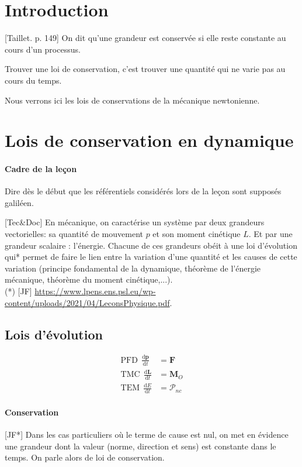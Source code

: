 \documentclass[11pt]{report}
\numberwithin{figure}{section}
\numberwithin{equation}{section}
\numberwithin{table}{section}
\newcommand{\ud}{\mathrm{d}}
\newcommand{\1}{\boldsymbol{1}}
\begin{document}
\section*{Introduction}


[Taillet. p. 149] On dit qu'une grandeur est conservée si elle reste constante au cours d'un processus.

Trouver une loi de conservation, c’est trouver une quantité qui ne varie pas au cours du temps.

Nous verrons ici les lois de conservations de la mécanique newtonienne.

\section{Lois de conservation en dynamique}

\paragraph{Cadre de la leçon} Dire dès le début que les référentiels considérés lors de la leçon sont supposés galiléen.

[Tec\&Doc] En mécanique, on caractérise un système par deux grandeurs vectorielles: sa quantité de mouvement $p$ et son moment cinétique $L$. Et par une grandeur scalaire : l'énergie. Chacune de ces grandeurs obéit à une loi d'évolution qui* permet de faire le lien entre la variation d’une quantité et les causes de cette variation (principe fondamental de la dynamique,
théorème de l’énergie mécanique, théorème du moment cinétique,...). \\
(*) [JF] \url{https://www.lpens.ens.psl.eu/wp-content/uploads/2021/04/LeconsPhysique.pdf}.

\subsection{Lois d'évolution}

\begin{align*}
\mathrm{PFD}~~ \frac{\ud \bm p}{\ud t} &= \bm F  \\
\mathrm{TMC}~~\frac{\ud \bm L}{\ud t} &= \bm M_O \\
\mathrm{TEM}~~\frac{\ud E}{\ud t} &= \mathcal{P}_{nc}
\end{align*}

\paragraph{Conservation} [JF*] Dans les cas particuliers où le terme de cause
est nul, on met en évidence une grandeur dont la valeur (norme, direction et sens) est constante dans le temps. On
parle alors de loi de conservation.
\end{document}
